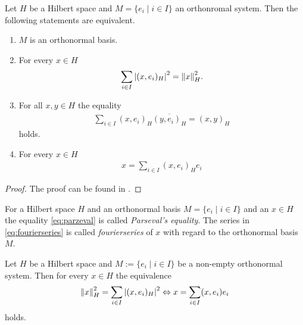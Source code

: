 \begin{theorem}
	Let $H$ be a Hilbert space and $M = \{e_i \mid i \in I\}$ an orthonromal system. Then the following statements are equivalent.
	\begin{enumerate}
		\item $M$ is an orthonormal basis.
		
		\item For every $x \in H$
		\begin{align}\label{eq:parzeval}
		\sum_{i \in I} \vbraces{(x, e_i)_H}^2 = \norm[H]{x}^2.
		\end{align}
		
		\item For all $x,y \in H$ the equality
		\begin{align*}
			\sum_{i \in I} (x, e_i)_H \overline{(y,e_i)_H} = (x,y)_H
		\end{align*}
		holds.
		
		\item For every $x \in H$  
		\begin{align} \label{eq:fourierseries}
		x = \sum_{i \in I} (x, e_i)_H e_i
		\end{align}
	\end{enumerate} 
\end{theorem}


\begin{proof}
	The proof can be found in \cite[p. 54]{FAna1}.
\end{proof}


\begin{definition}
	For a Hilbert space $H$ and an orthonormal basis $M = \{e_i \mid i \in I\}$ and an $x \in H$ the equality \eqref{eq:parzeval} is called \textit{Parseval's equality}. The series in \eqref{eq:fourierseries} is called \textit{fourierseries} of $x$ with regard to the orthonormal basis $M$. 
\end{definition}

\begin{lemma}
	Let $H$ be a Hilbert space and $M := \{e_i \mid i \in I\}$ be a non-empty orthonormal system. Then for every $x \in H$ the equivalence
	\begin{align}
		\norm[H]{x}^2 = \sum_{i \in I} \vbraces{(x, e_i)_H}^2 \Leftrightarrow x = \sum_{i \in I} (x,e_i) e_i \label{eq:parceval_to_fourier}
	\end{align}
	holds.
\end{lemma}

